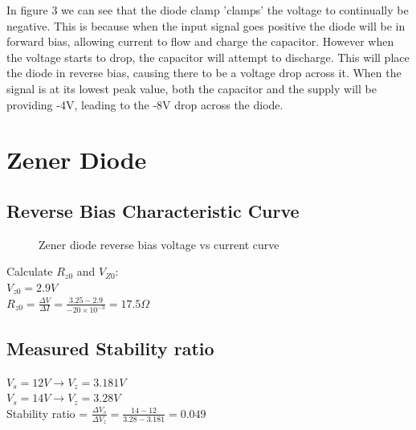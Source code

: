 \documentclass[a4paper,11pt]{article}
\begin{document}
In figure 3 we can see that the diode clamp 'clamps' the voltage to continually be negative. 	This is because when the input signal goes positive the diode will be in forward bias, allowing current to flow and charge the capacitor. However when the voltage starts to drop, the capacitor will attempt to discharge. This will place the diode in reverse bias, causing there to be a voltage drop across it. When the signal is at its lowest peak value, both the capacitor and the supply will be providing -4V, leading to the -8V drop across the diode.
\newpage

\section{Zener Diode}
\subsection{Reverse Bias Characteristic Curve}
\begin{figure}[h]
\centering
{}
\caption{Zener diode reverse bias voltage vs current curve}
\end{figure}

Calculate $R_{z0}$ and $V_{Z0}$:\\
$V_{z0} = 2.9V$\\
$R_{z0} = \frac{\Delta V}{\Delta I}=\frac{3.25 - 2.9}{-20\times 10^{-3}} = 17.5 \Omega $
\subsection{Measured Stability ratio}
$V_s = 12V \rightarrow V_z =3.181V$\\
$V_s = 14V \rightarrow V_z =3.28V$\\
Stability ratio = $\frac{\Delta V_s}{\Delta V_z} = \frac{14-12}{3.28-3.181} = 0.049$
\end{document}

